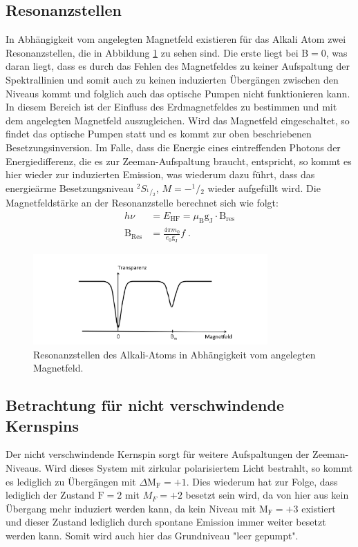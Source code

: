 \subsection{Resonanzstellen}
In Abhängigkeit vom angelegten Magnetfeld existieren für das Alkali Atom zwei Resonanzstellen, die in Abbildung \ref{abb:Resonanz} zu sehen sind. Die erste liegt bei $\text{B}=0$, was daran liegt, dass es durch das Fehlen des Magnetfeldes zu keiner Aufspaltung der Spektrallinien und somit auch zu keinen induzierten Übergängen zwischen den Niveaus kommt und folglich auch das optische Pumpen nicht funktionieren kann.
In diesem Bereich ist der Einfluss des Erdmagnetfeldes zu bestimmen und mit dem angelegten Magnetfeld auszugleichen.
Wird das Magnetfeld eingeschaltet, so findet das optische Pumpen statt und es kommt zur oben beschriebenen Besetzungsinversion.
Im Falle, dass die Energie eines eintreffenden Photons der Energiedifferenz, die es zur Zeeman-Aufspaltung braucht, entspricht, so kommt es hier wieder zur induzierten Emission, was wiederum dazu führt, dass das energieärme Besetzungsniveau ${}^2S_{{}^1\!/\!_2}$, $M=-^1\!/\!_2$ wieder aufgefüllt wird.
Die Magnetfeldstärke an der Resonanzstelle berechnet sich wie folgt:
\begin{align}
  \label{eq:2}
    h \nu &= E_{\text{HF}} = \mu_{\text{B}} \text{g}_{\text{J}} \cdot \text{B}_{\text{res}} \\
    \text{B}_{\text{Res}} &= \frac{4\pi m_0}{e_0 \text{g}_{\text{J}}}f \; .
\end{align}
\FloatBarrier
\begin{figure}
    \centering
    \includegraphics[width=0.8\textwidth]{Resonanz.PNG}
    \caption{Resonanzstellen des Alkali-Atoms in Abhängigkeit vom angelegten Magnetfeld.}
    \label{abb:Resonanz}
\end{figure}
\FloatBarrier

\subsection{Betrachtung für nicht verschwindende Kernspins}
Der nicht verschwindende Kernspin sorgt für weitere Aufspaltungen der Zeeman-Niveaus.
Wird dieses System mit zirkular polarisiertem Licht bestrahlt, so kommt
es lediglich zu Übergängen mit $\Delta \text{M}_{\text{F}} = +1$.
Dies wiederum hat zur Folge, dass lediglich der Zustand $\text{F}=2$ mit $M_F=+2$ besetzt sein wird, da von hier aus kein Übergang mehr induziert werden kann, da kein Niveau mit $\text{M}_{\text{F}}=+3$ existiert und dieser Zustand lediglich durch spontane Emission immer weiter besetzt werden kann.
Somit wird auch hier das Grundniveau "leer gepumpt".

